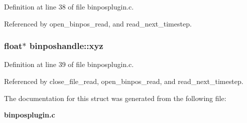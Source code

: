 Definition at line 38 of file binposplugin.c.

Referenced by open\_\-binpos\_\-read, and read\_\-next\_\-timestep.
\subsubsection{\setlength{\rightskip}{0pt plus 5cm}float$\ast$ binposhandle::xyz}\label{structbinposhandle_m3}




Definition at line 39 of file binposplugin.c.

Referenced by close\_\-file\_\-read, open\_\-binpos\_\-read, and read\_\-next\_\-timestep.

The documentation for this struct was generated from the following file:\begin{CompactItemize}
\item 
{\bf binposplugin.c}\end{CompactItemize}
